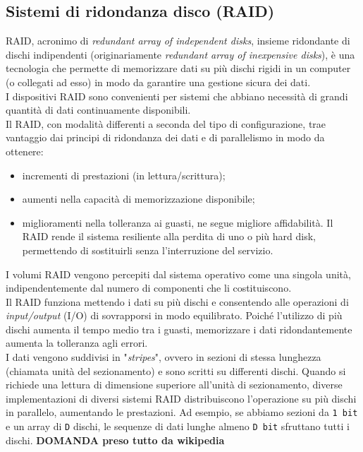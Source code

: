 \subsection{Sistemi di ridondanza disco (RAID)}
RAID, acronimo di \textit{redundant array of independent disks}, insieme ridondante di dischi indipendenti (originariamente \textit{redundant array of inexpensive disks}), \`{e} una tecnologia che permette di memorizzare dati su pi\`{u} dischi rigidi in un computer (o collegati ad esso) in modo da garantire una gestione sicura dei dati.\cite{etichetta9}\\
I dispositivi RAID sono convenienti per sistemi che abbiano necessit\`{a} di grandi quantit\`{a} di dati continuamente disponibili. \\
Il RAID, con modalit\`{a} differenti a seconda del tipo di configurazione, trae vantaggio dai principi di ridondanza dei dati e di parallelismo in modo da ottenere:
\begin{itemize}
\item 
incrementi di prestazioni (in lettura/scrittura);
\item
aumenti nella capacit\`{a} di memorizzazione disponibile;
\item 
miglioramenti nella tolleranza ai guasti, ne segue migliore affidabilit\`{a}.\cite{etichetta10} Il RAID rende il sistema resiliente alla perdita di uno o pi\`{u} hard disk, permettendo di sostituirli senza l'interruzione del servizio.\\
\end{itemize}
I volumi RAID vengono percepiti dal sistema operativo come una singola unit\`{a}, indipendentemente dal numero di componenti che li costituiscono.\\
Il RAID funziona mettendo i dati su pi\`{u} dischi e consentendo alle operazioni di \textit{input/output} (I/O) di sovrapporsi in modo equilibrato. Poich\'{e} l'utilizzo di pi\`{u} dischi aumenta il tempo medio tra i guasti, memorizzare i dati ridondantemente aumenta la tolleranza agli errori.\cite{etichetta9}\\

I dati vengono suddivisi in "\textit{stripes}", ovvero in sezioni di stessa lunghezza (chiamata unit\`{a} del sezionamento) e sono scritti su differenti dischi. Quando si richiede una lettura di dimensione superiore all'unit\`{a} di sezionamento, diverse implementazioni di diversi sistemi RAID distribuiscono l'operazione su pi\`{u} dischi in parallelo, aumentando le prestazioni. Ad esempio, se abbiamo sezioni da \verb"1 bit" e un array di \verb"D" dischi, le sequenze di dati lunghe almeno \verb"D bit" sfruttano tutti i dischi. \textbf{ DOMANDA preso tutto da wikipedia}

